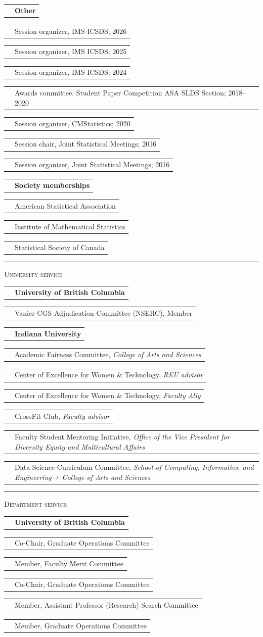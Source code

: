 \documentclass[11pt,letterpaper]{minimal/moderncv}
\makeatletter
\newcommand{\xx}{\textcolor{white}{2022}}
\newcommand{\xxx}{\textcolor{white}{--2022}}
\renewcommand{\cventry}[2]{\cvitem{#1}{\begin{minipage}[t]{\maincolumnwidth}#2\end{minipage}}}
\newcommand{\bolditem}[1]{\cvitem{}{\textbf{#1}}}
\renewcommand{\section}[1]{  \par\addvspace{15pt}%
  \parbox[t]{\hintscolumnwidth}{\strut\raggedleft\raisebox{4pt}%
  {\rule{\hintscolumnwidth}{2pt}}}%
  \hspace{\separatorcolumnwidth}%
  \textsc{\Large #1}\par\nobreak\addvspace{6pt}%
}
\renewcommand*{\cvitem}[2]{%
  \begin{tabular}{@{}p{\hintscolumnwidth}@{\hspace{\separatorcolumnwidth}}%
    p{\maincolumnwidth}@{}}%
    \raggedleft {#1} &  {#2}%
  \end{tabular}%
}
\makeatother
\begin{document}
\vspace{6pt}
\bolditem{Other}
\cvitem{}{Session organizer, IMS ICSDS; 2026}
\cvitem{}{Session organizer, IMS ICSDS; 2025}
\cvitem{}{Session organizer, IMS ICSDS; 2024}
\cvitem{}{Awards committee, Student Paper Competition ASA SLDS
  Section; 2018--2020}
\cvitem{}{Session organizer, CMStatistics; 2020}
\cvitem{}{Session chair, Joint Statistical Meetings; 2016}
\cvitem{}{Session organizer, Joint Statistical Meetings; 2016}

\vspace{6pt}
\bolditem{Society memberships}
\cvitem{}{American Statistical Association}
\cvitem{}{Institute of Mathematical Statistics}
\cvitem{}{Statistical Society of Canada}

\section{University service}

\cvitem{}{\textbf{University of British Columbia}}
\cventry{2021--2022}{Vanier CGS Adjudication Committee (NSERC), Member }

\vspace{6pt}
\cvitem{}{\textbf{Indiana University}}
\cventry{2019--2020}{Academic Fairness Committee, \emph{College of Arts and Sciences}}

\cventry{2019--2020}{Center of Excellence for Women \& Technology. \emph{REU
  advisor}}

\cventry{2017--2020}{Center of Excellence for Women \& Technology, \emph{Faculty
Ally}}

\cventry{2015--2020}{CrossFit Club, \emph{Faculty advisor}}

\cventry{2016--2018}{Faculty Student Mentoring Initiative, \emph{Office of the
  Vice President for Diversity Equity and Multicultural Affairs}}

\cventry{2014--2018}{Data Science Curriculum Committee, \emph{School
    of Computing, Informatics, and Engineering + College of Arts and Sciences}}






\section{Department service}

\cvitem{}{\textbf{University of British Columbia}}
\cventry{2025--\xx}{Co-Chair, Graduate Operations Committee}
\cventry{2022\xxx}{Member, Faculty Merit Committee}
\cventry{2022--2024}{Co-Chair, Graduate Operations Committee}
\cventry{2021--2022}{Member, Assistant Professor (Research) Search Committee}
\cventry{2020--\xx}{Member, Graduate Operations Committee}
\end{document}
